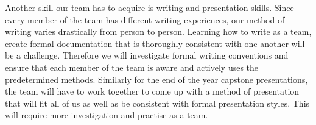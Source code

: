 \documentclass[12pt, titlepage]{article}
\begin{document}
\noindent Another skill our team has to acquire is writing and presentation skills. Since every member of the team has different writing experiences, our method of writing varies drastically from person to person. Learning how to write as a team, create formal documentation that is thoroughly consistent with one another will be a challenge. Therefore we will investigate formal writing conventions and ensure that each member of the team is aware and actively uses the predetermined methods. Similarly for the end of the year capstone presentations, the team will have to work together to come up with a method of presentation that will fit all of us as well as be consistent with formal presentation styles. This will require more investigation and practise as a team.\\



\end{document}
